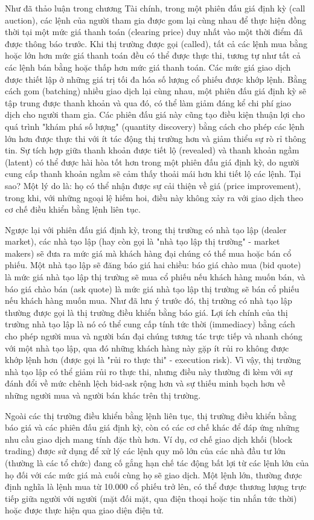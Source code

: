 Như đã thảo luận trong chương Tài chính, trong một phiên đấu giá định kỳ (call auction), các lệnh của người tham gia được gom lại cùng nhau để thực hiện đồng thời tại một mức giá thanh toán (clearing price) duy nhất vào một thời điểm đã được thông báo trước. Khi thị trường được gọi (called), tất cả các lệnh mua bằng hoặc lớn hơn mức giá thanh toán đều có thể được thực thi, tương tự như tất cả các lệnh bán bằng hoặc thấp hơn mức giá thanh toán. Các mức giá giao dịch được thiết lập ở những giá trị tối đa hóa số lượng cổ phiếu được khớp lệnh. Bằng cách gom (batching) nhiều giao dịch lại cùng nhau, một phiên đấu giá định kỳ sẽ tập trung được thanh khoản và qua đó, có thể làm giảm đáng kể chi phí giao dịch cho người tham gia. Các phiên đấu giá này cũng tạo điều kiện thuận lợi cho quá trình "khám phá số lượng" (quantity discovery) bằng cách cho phép các lệnh lớn hơn được thực thi với ít tác động thị trường hơn và giảm thiểu sự rò rỉ thông tin. Sự tích hợp giữa thanh khoản được tiết lộ (revealed) và thanh khoản ngầm (latent) có thể được hài hòa tốt hơn trong một phiên đấu giá định kỳ, do người cung cấp thanh khoản ngầm sẽ cảm thấy thoải mái hơn khi tiết lộ các lệnh. Tại sao? Một lý do là: họ có thể nhận được sự cải thiện về giá (price improvement), trong khi, với những ngoại lệ hiếm hoi, điều này không xảy ra với giao dịch theo cơ chế điều khiển bằng lệnh liên tục.

Ngược lại với phiên đấu giá định kỳ, trong thị trường có nhà tạo lập (dealer market), các nhà tạo lập (hay còn gọi là "nhà tạo lập thị trường" - market makers) sẽ đưa ra mức giá mà khách hàng đại chúng có thể mua hoặc bán cổ phiếu. Một nhà tạo lập sẽ đăng báo giá hai chiều: báo giá chào mua (bid quote) là mức giá nhà tạo lập thị trường sẽ mua cổ phiếu nếu khách hàng muốn bán, và báo giá chào bán (ask quote) là mức giá nhà tạo lập thị trường sẽ bán cổ phiếu nếu khách hàng muốn mua. Như đã lưu ý trước đó, thị trường có nhà tạo lập thường được gọi là thị trường điều khiển bằng báo giá. Lợi ích chính của thị trường nhà tạo lập là nó có thể cung cấp tính tức thời (immediacy) bằng cách cho phép người mua và người bán đại chúng tương tác trực tiếp và nhanh chóng với một nhà tạo lập, qua đó những khách hàng này gặp ít rủi ro không được khớp lệnh hơn (được gọi là "rủi ro thực thi" - execution risk). Vì vậy, thị trường nhà tạo lập có thể giảm rủi ro thực thi, nhưng điều này thường đi kèm với sự đánh đổi về mức chênh lệch bid-ask rộng hơn và sự thiếu minh bạch hơn về những người mua và người bán khác trên thị trường.

Ngoài các thị trường điều khiển bằng lệnh liên tục, thị trường điều khiển bằng báo giá và các phiên đấu giá định kỳ, còn có các cơ chế khác để đáp ứng những nhu cầu giao dịch mang tính đặc thù hơn. Ví dụ, cơ chế giao dịch khối (block trading) được sử dụng để xử lý các lệnh quy mô lớn của các nhà đầu tư lớn (thường là các tổ chức) đang cố gắng hạn chế tác động bất lợi từ các lệnh lớn của họ đối với các mức giá mà cuối cùng họ sẽ giao dịch. Một lệnh lớn, thường được định nghĩa là lệnh mua từ 10.000 cổ phiếu trở lên, có thể được thương lượng trực tiếp giữa người với người (mặt đối mặt, qua điện thoại hoặc tin nhắn tức thời) hoặc được thực hiện qua giao diện điện tử.

